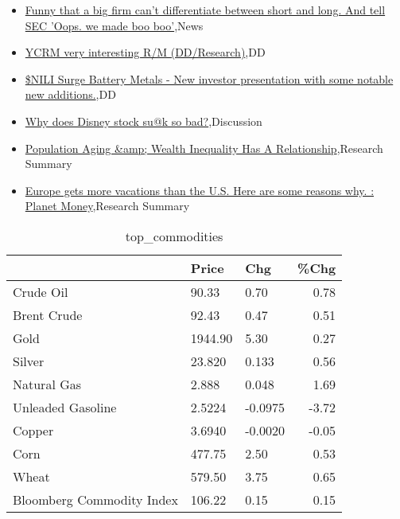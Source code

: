 \documentclass{article}%
\begin{document}
%
\begin{itemize}%
\item%
\href{https://reddit.com/r/wallstreetbets/comments/16q0owo/funny\_that\_a\_big\_firm\_cant\_differentiate\_between/}{Funny that a big firm can't differentiate between short and long. And tell SEC 'Oops. we made boo boo'},News%
\item%
\href{https://reddit.com/r/Baystreetbets/comments/16pkje0/ycrm\_very\_interesting\_rm\_ddresearch/}{YCRM very interesting R/M (DD/Research)},DD%
\item%
\href{https://reddit.com/r/Baystreetbets/comments/16pc2sw/nili\_surge\_battery\_metals\_new\_investor/}{\$NILI Surge Battery Metals - New investor presentation with some notable new additions.},DD%
\item%
\href{https://reddit.com/r/StockMarket/comments/16phfo1/why\_does\_disney\_stock\_suk\_so\_bad/}{Why does Disney stock su@k so bad?},Discussion%
\item%
\href{https://reddit.com/r/Economics/comments/16plwr9/population\_aging\_wealth\_inequality\_has\_a/}{Population Aging \&amp; Wealth Inequality Has A Relationship},Research Summary%
\item%
\href{https://reddit.com/r/Economics/comments/16pip4w/europe\_gets\_more\_vacations\_than\_the\_us\_here\_are/}{Europe gets more vacations than the U.S. Here are some reasons why. : Planet Money},Research Summary%
\end{itemize}%


\begin{table}[htbp]%
\caption{top\_commodities}%
\centering%
\begin{adjustbox}{width=1\textwidth}%
\begin{tabular}{lllr}
\toprule
                          &   Price &     Chg &  \%Chg \\
\midrule
               Crude Oil  &   90.33 &    0.70 &  0.78 \\
             Brent Crude  &   92.43 &    0.47 &  0.51 \\
                    Gold  & 1944.90 &    5.30 &  0.27 \\
                  Silver  &  23.820 &   0.133 &  0.56 \\
             Natural Gas  &   2.888 &   0.048 &  1.69 \\
       Unleaded Gasoline  &  2.5224 & -0.0975 & -3.72 \\
                  Copper  &  3.6940 & -0.0020 & -0.05 \\
                    Corn  &  477.75 &    2.50 &  0.53 \\
                   Wheat  &  579.50 &    3.75 &  0.65 \\
Bloomberg Commodity Index &  106.22 &    0.15 &  0.15 \\
\bottomrule
\end{tabular}
%
\end{adjustbox}%
\end{table}
\end{document}
